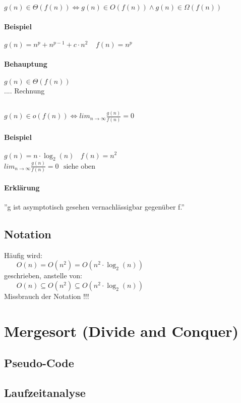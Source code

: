 \subsection{}
$g(n) \in \Theta(f(n)) \Leftrightarrow g(n) \in O(f(n)) \land g(n) \in \Omega(f(n))$
\paragraph{Beispiel} $g(n) = n^p + n^{p-1} + c \cdot n^2~~~~~f(n) = n^p$
\paragraph{Behauptung} $g(n) \in \Theta(f(n))$ \\
.... Rechnung

\subsection{}

$g(n) \in o(f(n)) \Leftrightarrow lim_{n \rightarrow \infty} \frac{g(n)}{f(n)} = 0$
\paragraph{Beispiel} $g(n) = n \cdot \log_2(n)~~~~f(n) = n^2$\\
$lim_{n \rightarrow \infty} \frac{g(n)}{f(n)} = 0~~~\text{siehe oben}$\\
\paragraph{Erklärung} ''g ist asymptotisch gesehen vernachlässigbar gegenüber f.''

\pagebreak


\begin{mdframed}
\subsection{Notation}
Häufig wird:\\
$~~~~~~~~O(n) = O(n^2) = O(n^2 \cdot \log_2(n))$ \\
geschrieben, anstelle von:\\
$~~~~~~~~O(n) \subseteq O(n^2) \subseteq O(n^2 \cdot \log_2(n))$ \\
Missbrauch der Notation !!!\\

\end{mdframed}


\section{Mergesort (Divide and Conquer)}

\subsection{Pseudo-Code}


\pagebreak

\subsection{Laufzeitanalyse}